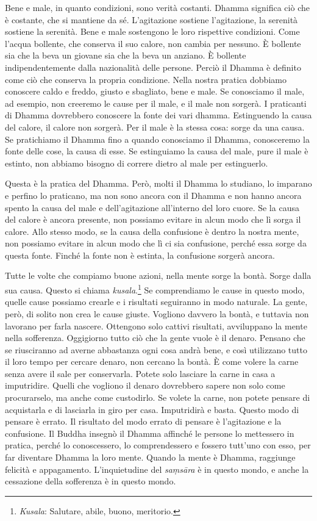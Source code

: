 Bene e male, in quanto condizioni, sono verità costanti. Dhamma
significa ciò che è costante, che si mantiene da sé. L'agitazione
sostiene l'agitazione, la serenità sostiene la serenità. Bene e male
sostengono le loro rispettive condizioni. Come l'acqua bollente, che
conserva il suo calore, non cambia per nessuno. È bollente sia che la
beva un giovane sia che la beva un anziano. È bollente indipendentemente
dalla nazionalità delle persone. Perciò il Dhamma è definito come ciò
che conserva la propria condizione. Nella nostra pratica dobbiamo
conoscere caldo e freddo, giusto e sbagliato, bene e male. Se conosciamo
il male, ad esempio, non creeremo le cause per il male, e il male non
sorgerà. I praticanti di Dhamma dovrebbero conoscere la fonte dei vari
dhamma. Estinguendo la causa del calore, il calore non sorgerà.
Per il male è la stessa cosa: sorge da una causa. Se pratichiamo il
Dhamma fino a quando conosciamo il Dhamma, conosceremo la fonte delle
cose, la causa di esse. Se estinguiamo la causa del male, pure il male è
estinto, non abbiamo bisogno di correre dietro al male per estinguerlo.

Questa è la pratica del Dhamma. Però, molti il Dhamma lo studiano, lo
imparano e perfino lo praticano, ma non sono ancora con il Dhamma e non
hanno ancora spento la causa del male e dell'agitazione all'interno del
loro cuore. Se la causa del calore è ancora presente, non possiamo
evitare in alcun modo che lì sorga il calore. Allo stesso modo, se la
causa della confusione è dentro la nostra mente, non possiamo evitare in
alcun modo che lì ci sia confusione, perché essa sorge da questa fonte.
Finché la fonte non è estinta, la confusione sorgerà ancora.

Tutte le volte che compiamo buone azioni, nella mente sorge la bontà.
Sorge dalla sua causa. Questo si chiama \emph{kusala}.\footnote{\emph{Kusala}:
  Salutare, abile, buono, meritorio.} Se comprendiamo le cause in questo
modo, quelle cause possiamo crearle e i risultati seguiranno in modo
naturale. La gente, però, di solito non crea le cause giuste. Vogliono
davvero la bontà, e tuttavia non lavorano per farla nascere. Ottengono
solo cattivi risultati, avviluppano la mente nella sofferenza.
Oggigiorno tutto ciò che la gente vuole è il denaro. Pensano che se
riusciranno ad averne abbastanza ogni cosa andrà bene, e così utilizzano
tutto il loro tempo per cercare denaro, non cercano la bontà. È come
volere la carne senza avere il sale per conservarla. Potete solo
lasciare la carne in casa a imputridire. Quelli che vogliono il denaro
dovrebbero sapere non solo come procurarselo, ma anche come custodirlo.
Se volete la carne, non potete pensare di acquistarla e di lasciarla in
giro per casa. Imputridirà e basta. Questo modo di pensare è errato. Il
risultato del modo errato di pensare è l'agitazione e la confusione. Il
Buddha insegnò il Dhamma affinché le persone lo mettessero in pratica,
perché lo conoscessero, lo comprendessero e fossero tutt'uno con esso,
per far diventare Dhamma la loro mente. Quando la mente è Dhamma,
raggiunge felicità e appagamento. L'inquietudine del \emph{saṃsāra} è in
questo mondo, e anche la cessazione della sofferenza è in questo mondo.

